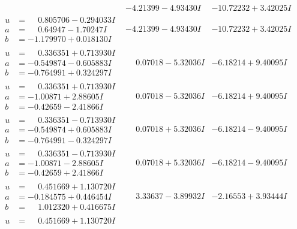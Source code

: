 \documentclass[1p]{elsarticle_modified}
\theoremstyle{definition}
\begin{document}
$$\begin{array}{c|c|c}
 & -4.21399 - 4.93430 I & -10.72232 + 3.42025 I \\ \hline\begin{aligned}
u &= \phantom{-}0.805706 - 0.294033 I \\
a &= \phantom{-}0.64947 - 1.70247 I \\
b &= -1.179970 + 0.018130 I\end{aligned}
 & -4.21399 - 4.93430 I & -10.72232 + 3.42025 I \\ \hline\begin{aligned}
u &= \phantom{-}0.336351 + 0.713930 I \\
a &= -0.549874 - 0.605883 I \\
b &= -0.764991 + 0.324297 I\end{aligned}
 & \phantom{-}0.07018 - 5.32036 I & -6.18214 + 9.40095 I \\ \hline\begin{aligned}
u &= \phantom{-}0.336351 + 0.713930 I \\
a &= -1.00871 + 2.88605 I \\
b &= -0.42659 - 2.41866 I\end{aligned}
 & \phantom{-}0.07018 - 5.32036 I & -6.18214 + 9.40095 I \\ \hline\begin{aligned}
u &= \phantom{-}0.336351 - 0.713930 I \\
a &= -0.549874 + 0.605883 I \\
b &= -0.764991 - 0.324297 I\end{aligned}
 & \phantom{-}0.07018 + 5.32036 I & -6.18214 - 9.40095 I \\ \hline\begin{aligned}
u &= \phantom{-}0.336351 - 0.713930 I \\
a &= -1.00871 - 2.88605 I \\
b &= -0.42659 + 2.41866 I\end{aligned}
 & \phantom{-}0.07018 + 5.32036 I & -6.18214 - 9.40095 I \\ \hline\begin{aligned}
u &= \phantom{-}0.451669 + 1.130720 I \\
a &= -0.184575 + 0.446454 I \\
b &= \phantom{-}1.012320 + 0.416675 I\end{aligned}
 & \phantom{-}3.33637 - 3.89932 I & -2.16553 + 3.93444 I \\ \hline\begin{aligned}
u &= \phantom{-}0.451669 + 1.130720 I \\

\end{aligned}
\end{array}$$
\end{document}
